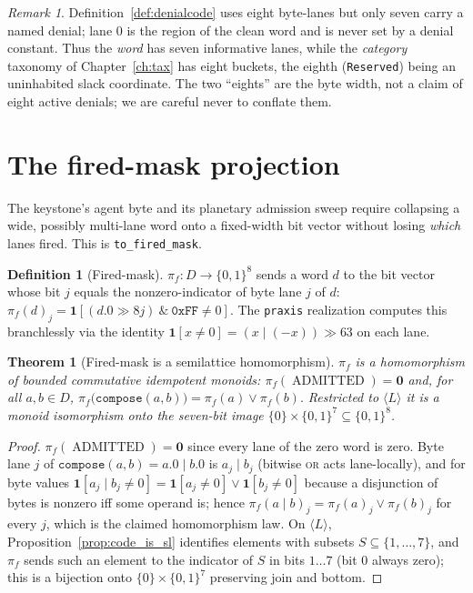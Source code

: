 \documentclass[11pt,oneside]{book}
\theoremstyle{definition}
\newtheorem{definition}{Definition}[chapter]
\theoremstyle{plain}
\newtheorem{theorem}{Theorem}[chapter]
\theoremstyle{remark}
\newtheorem*{remark}{Remark}
\newcommand{\code}[1]{\texttt{#1}}
\newcommand{\Deny}{D}                 %
\newcommand{\Adml}{\operatorname{ADMITTED}}          %
\newcommand{\firedmap}{\pi_{f}}                %
\begin{document}
\begin{remark}
Definition~\ref{def:denialcode} uses eight byte-lanes but only seven carry a named denial; lane $0$ is the region of the clean word and is never set by a denial constant. %
Thus the \emph{word} has seven informative lanes, while the \emph{category} taxonomy of Chapter~\ref{ch:tax} has eight buckets, the eighth (\code{Reserved}) being an uninhabited slack coordinate. %
The two ``eights'' are the byte width, not a claim of eight active denials; we are careful never to conflate them. %
\end{remark}

\section{The fired-mask projection}

The keystone's agent byte and its planetary admission sweep require collapsing a wide, possibly multi-lane word onto a fixed-width bit vector without losing \emph{which} lanes fired. %
This is \code{to\_fired\_mask}. %

\begin{definition}[Fired-mask]\label{def:fired}
$\firedmap:\Deny\to\{0,1\}^{8}$ sends a word $d$ to the bit vector whose bit $j$ equals the nonzero-indicator of byte lane $j$ of $d$: $\firedmap(d)_j=\mathbf 1[(d.0\gg 8j)\ \&\ \code{0xFF}\ne 0]$. %
The \code{praxis} realization computes this branchlessly via the identity $\mathbf 1[x\ne 0]=(x\mathbin{|}(-x))\gg 63$ on each lane. %
\end{definition}

\begin{theorem}[Fired-mask is a semilattice homomorphism]\label{thm:firedhom}
$\firedmap$ is a homomorphism of bounded commutative idempotent monoids: $\firedmap(\Adml)=\bm 0$ and, for all $a,b\in\Deny$, $\firedmap\bigl(\code{compose}(a,b)\bigr)=\firedmap(a)\lor\firedmap(b).$ %
Restricted to $\langle L\rangle$ it is a monoid isomorphism onto the seven-bit image $\{0\}\times\{0,1\}^{7}\subseteq\{0,1\}^{8}$. %
\end{theorem}

\begin{proof}
$\firedmap(\Adml)=\bm 0$ since every lane of the zero word is zero. %
Byte lane $j$ of $\code{compose}(a,b)=a.0\mathbin{|}b.0$ is $a_j\mathbin{|}b_j$ (bitwise \textsc{or} acts lane-locally), and for byte values $\mathbf 1[a_j\mathbin{|}b_j\ne 0] =\mathbf 1[a_j\ne 0]\lor\mathbf 1[b_j\ne 0]$ because a disjunction of bytes is nonzero iff some operand is; hence $\firedmap(a\mathbin{|}b)_j=\firedmap(a)_j\lor\firedmap(b)_j$ for every $j$, which is the claimed homomorphism law. %
On $\langle L\rangle$, Proposition~\ref{prop:code_is_sl} identifies elements with subsets $S\subseteq\{1,\dots,7\}$, and $\firedmap$ sends such an element to the indicator of $S$ in bits $1\ldots7$ (bit $0$ always zero); this is a bijection onto $\{0\}\times\{0,1\}^{7}$ preserving join and bottom. %
\end{proof}
\end{document}
